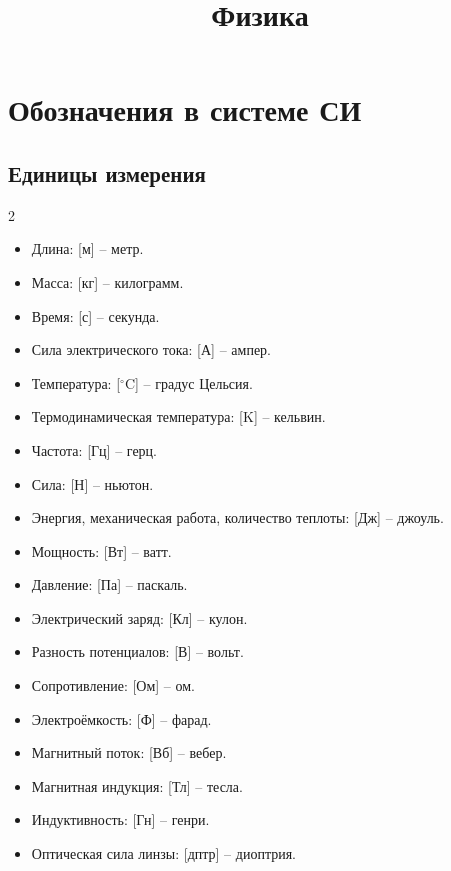 \documentclass[12pt]{article}
\title{\textbf{Физика}}\date{}\author{}
\begin{document}
\maketitle
\tableofcontents
\label{toc}
\newpage

\section{Обозначения в системе СИ}

\setlength{\columnsep}{1.5cm}

\subsection{Единицы измерения}

\begin{center}
    \begin{multicols}{2}
        \begin{itemize}[leftmargin=*, itemsep=0pt]
            \item Длина: [м] -- метр.
            \item Масса: [кг] -- килограмм.
            \item Время: [с] -- секунда.
            \item Сила электрического тока: [А] -- ампер.
            \item Температура: [$^\circ$C] -- градус Цельсия.
            \item Термодинамическая температура: [K] -- кельвин.
            \item Частота: [Гц] -- герц.
            \item Сила: [Н] -- ньютон.
            \item Энергия, механическая работа, количество теплоты: [Дж] -- джоуль.
            \item Мощность: [Вт] -- ватт.
            \item Давление: [Па] -- паскаль.
            \item Электрический заряд: [Кл] -- кулон.
            \item Разность потенциалов: [В] -- вольт.
            \item Сопротивление: [Ом] -- ом.
            \item Электроёмкость: [Ф] -- фарад.
            \item Магнитный поток: [Вб] -- вебер.
            \item Магнитная индукция: [Тл] -- тесла.
            \item Индуктивность: [Гн] -- генри.
            \item Оптическая сила линзы: [дптр] -- диоптрия.
        \end{itemize}
    \end{multicols}
\end{center}
\end{document}
